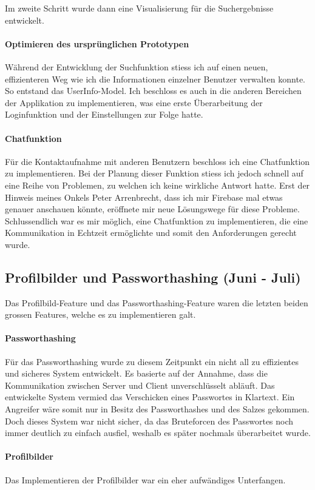 \documentclass[../main.tex]{subfiles}
\begin{document}
	Im zweite Schritt wurde dann eine Visualisierung für die Suchergebnisse entwickelt.
	
	\paragraph{Optimieren des ursprünglichen Prototypen}
	Während der Entwicklung der Suchfunktion stiess ich auf einen neuen, effizienteren Weg wie ich die Informationen einzelner Benutzer verwalten konnte. So entstand das UserInfo-Model. Ich beschloss es auch in die anderen Bereichen der Applikation zu implementieren, was eine erste Überarbeitung der Loginfunktion und der Einstellungen zur Folge hatte.
	
	\paragraph{Chatfunktion}
	Für die Kontaktaufnahme mit anderen Benutzern beschloss ich eine Chatfunktion zu implementieren. Bei der Planung dieser Funktion stiess ich jedoch schnell auf eine Reihe von Problemen, zu welchen ich keine wirkliche Antwort hatte. Erst der Hinweis meines Onkels Peter Arrenbrecht, dass ich mir Firebase mal etwas genauer anschauen könnte, eröffnete mir neue Lösungswege für diese Probleme. Schlussendlich war es mir möglich, eine Chatfunktion zu implementieren, die eine Kommunikation in Echtzeit ermöglichte und somit den Anforderungen gerecht wurde.
	
	\subsection{Profilbilder und Passworthashing (Juni - Juli)}
	Das Profilbild-Feature und das Passworthashing-Feature waren die letzten beiden grossen Features, welche es zu implementieren galt.
	\paragraph{Passworthashing}
	Für das Passworthashing wurde zu diesem Zeitpunkt ein nicht all zu effizientes und sicheres System entwickelt. Es basierte auf der Annahme, dass die Kommunikation zwischen Server und Client unverschlüsselt abläuft. Das entwickelte System vermied das Verschicken eines Passwortes in Klartext. Ein Angreifer wäre somit nur in Besitz des Passworthashes und des Salzes gekommen. Doch dieses System war nicht sicher, da das Bruteforcen des Passwortes noch immer deutlich zu einfach ausfiel, weshalb es später nochmals überarbeitet wurde.
	\paragraph{Profilbilder}
	Das Implementieren der Profilbilder war ein eher aufwändiges Unterfangen.
	
\end{document}

